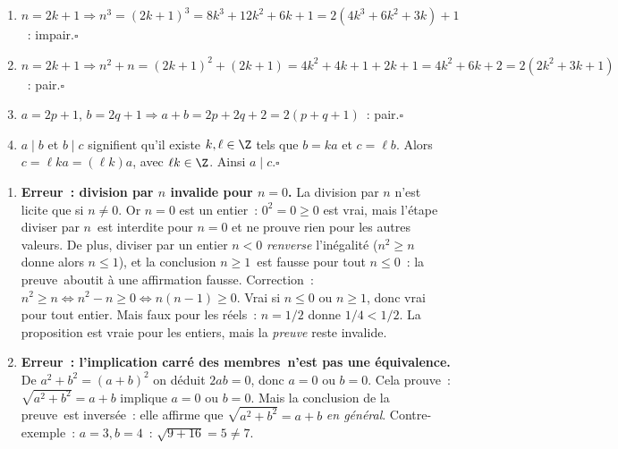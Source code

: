 
\begin{enumerate}
  \item $n=2k+1\Rightarrow n^3=(2k+1)^3=8k^3+12k^2+6k+1=2(4k^3+6k^2+3k)+1$~: impair.\hfill$\square$
  \item $n=2k+1\Rightarrow n^2+n=(2k+1)^2+(2k+1)=4k^2+4k+1+2k+1=4k^2+6k+2=2(2k^2+3k+1)$~: pair.\hfill$\square$
  \item $a=2p+1$, $b=2q+1\Rightarrow a+b=2p+2q+2=2(p+q+1)$~: pair.\hfill$\square$
  \item $a\mid b$ et $b\mid c$ signifient qu'il existe $k,\ell\in\Z$ tels que
        $b=ka$ et $c=\ell b$. Alors $c=\ell ka=(\ell k)a$,
        avec $\ell k\in\Z$. Ainsi $a\mid c$.\hfill$\square$
\end{enumerate}


\begin{enumerate}
  \item \textbf{Erreur~: division par $n$ invalide pour $n=0$.}
        La division par $n$ n'est licite que si $n\ne0$.
        Or $n=0$ est un entier~: $0^2=0\geq0$ est vrai,
        mais l'\'etape \og diviser par $n$\fg\ est interdite pour $n=0$
        et ne prouve rien pour les autres valeurs.
        De plus, diviser par un entier $n<0$ \emph{renverse} l'in\'egalit\'e
        ($n^2\geq n$ donne alors $n\leq1$), et la conclusion \og $n\geq1$\fg\ est fausse
        pour tout $n\leq0$~: la \og preuve\fg\ aboutit \`a une affirmation fausse.
        Correction~: $n^2\geq n\Leftrightarrow n^2-n\geq0\Leftrightarrow n(n-1)\geq0$.
        Vrai si $n\leq0$ ou $n\geq1$, donc vrai pour tout entier.
        Mais faux pour les r\'eels~: $n=1/2$ donne $1/4<1/2$.
        La proposition est vraie pour les entiers, mais la \emph{preuve} reste invalide.
  \item \textbf{Erreur~: l'implication \og carr\'e des membres\fg\ n'est pas une \'equivalence.}
        De $a^2+b^2=(a+b)^2$ on d\'eduit $2ab=0$, donc $a=0$ ou $b=0$.
        Cela prouve~: $\sqrt{a^2+b^2}=a+b$ implique $a=0$ ou $b=0$.
        Mais la conclusion de la \og preuve\fg\ est invers\'ee~:
        elle affirme que $\sqrt{a^2+b^2}=a+b$ \emph{en g\'en\'eral}.
        Contre-exemple~: $a=3, b=4$~: $\sqrt{9+16}=5\ne7$.
\end{enumerate}

